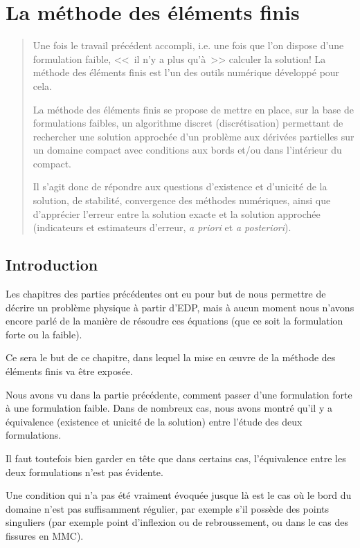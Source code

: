 \chapter{La méthode des éléments finis}\label{Ch-MEF}
\begin{abstract}
Une fois le travail précédent accompli, i.e. une fois que l'on dispose d'une
formulation faible, <<~il n'y a plus qu'à~>> calculer la solution!
La méthode des éléments finis est l'un des outils numérique développé pour cela.

La méthode des éléments finis se propose de mettre en place, sur la base de
formulations faibles, un algorithme discret (discrétisation) permettant de rechercher
une solution approchée d'un problème aux dérivées partielles sur un domaine
compact avec conditions aux bords et/ou dans l'intérieur du compact.

Il s'agit donc de répondre aux questions d'existence et d'unicité de la solution,
de stabilité, convergence des méthodes numériques, ainsi que d'apprécier
l'erreur entre la solution exacte et la solution approchée (indicateurs et estimateurs
d'erreur, \emph{a priori} et \emph{a posteriori}).
\end{abstract}

\medskip
\section{Introduction}
Les chapitres des parties précédentes ont eu pour but de nous permettre de décrire
un problème physique à partir d'EDP, mais à aucun moment nous n'avons encore
parlé de la manière de résoudre ces équations (que ce soit la formulation forte ou la faible).

Ce sera le but de ce chapitre, dans lequel la mise en œuvre de la méthode
des éléments finis va être exposée.

\medskip
Nous avons vu dans la partie précédente, comment passer d'une formulation
forte à une formulation faible.
Dans de nombreux cas, nous avons montré qu'il y a équivalence (existence et unicité de
la solution) entre l'étude des deux formulations.

Il faut toutefois bien garder en tête que dans certains cas, l'équivalence entre les deux
formulations n'est pas évidente.

Une condition qui n'a pas été vraiment évoquée jusque là est le cas où
le bord du domaine n'est pas suffisamment régulier, par exemple
s'il possède des points singuliers (par exemple point d'inflexion ou de rebroussement, ou
dans le cas des fissures en MMC).

